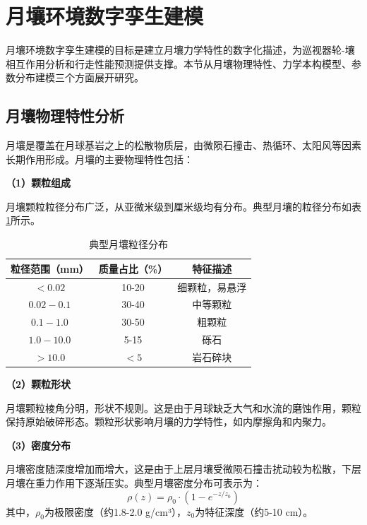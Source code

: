 \section{月壤环境数字孪生建模}
\label{sec:soil_modeling}

月壤环境数字孪生建模的目标是建立月壤力学特性的数字化描述，为巡视器轮-壤相互作用分析和行走性能预测提供支撑。本节从月壤物理特性、力学本构模型、参数分布建模三个方面展开研究。

\subsection{月壤物理特性分析}
\label{subsec:soil_properties}

月壤是覆盖在月球基岩之上的松散物质层，由微陨石撞击、热循环、太阳风等因素长期作用形成。月壤的主要物理特性包括：

\textbf{（1）颗粒组成}

月壤颗粒粒径分布广泛，从亚微米级到厘米级均有分布。典型月壤的粒径分布如表\ref{tab:soil_grain}所示。

\begin{table}[htbp]
    \centering
    \caption{典型月壤粒径分布}
    \label{tab:soil_grain}
    \begin{tabular}{ccc}
        \toprule
        粒径范围（mm） & 质量占比（\%） & 特征描述 \\
        \midrule
        $<0.02$ & 10-20 & 细颗粒，易悬浮 \\
        $0.02-0.1$ & 30-40 & 中等颗粒 \\
        $0.1-1.0$ & 30-50 & 粗颗粒 \\
        $1.0-10.0$ & 5-15 & 砾石 \\
        $>10.0$ & $<5$ & 岩石碎块 \\
        \bottomrule
    \end{tabular}
\end{table}

\textbf{（2）颗粒形状}

月壤颗粒棱角分明，形状不规则。这是由于月球缺乏大气和水流的磨蚀作用，颗粒保持原始破碎形态。颗粒形状影响月壤的力学特性，如内摩擦角和内聚力。

\textbf{（3）密度分布}

月壤密度随深度增加而增大，这是由于上层月壤受微陨石撞击扰动较为松散，下层月壤在重力作用下逐渐压实。典型月壤密度分布可表示为：
\begin{equation}
    \rho(z) = \rho_0 \cdot (1 - e^{-z/z_0})
    \label{eq:soil_density}
\end{equation}
其中，$\rho_0$为极限密度（约1.8-2.0 g/cm³），$z_0$为特征深度（约5-10 cm）。


